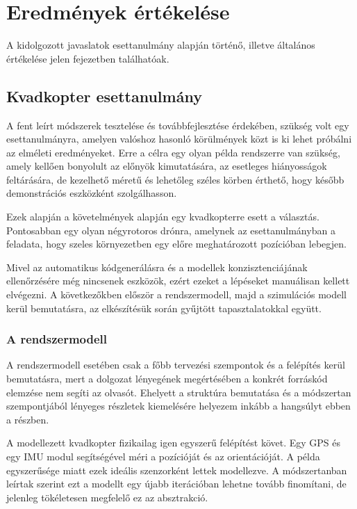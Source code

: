\chapter{Eredmények értékelése}
A kidolgozott javaslatok esettanulmány alapján történő, illetve általános értékelése jelen fejezetben találhatóak.

\section{Kvadkopter esettanulmány}
A fent leírt módszerek tesztelése és továbbfejlesztése érdekében, szükség volt egy esettanulmányra, amelyen valóshoz hasonló körülmények közt is ki lehet próbálni az elméleti eredményeket.
Erre a célra egy olyan példa rendszerre van szükség, amely kellően bonyolult az előnyök kimutatására, az esetleges hiányosságok feltárására, de kezelhető méretű és lehetőleg széles körben érthető, hogy később demonstrációs eszközként szolgálhasson.

Ezek alapján a követelmények alapján egy kvadkopterre esett a választás. Pontosabban egy olyan négyrotoros drónra, amelynek az esettanulmányban a feladata, hogy szeles környezetben egy előre meghatározott pozícióban lebegjen.

Mivel az automatikus kódgenerálásra és a modellek konzisztenciájának ellenőrzésére még nincsenek eszközök, ezért ezeket a lépéseket manuálisan kellett elvégezni.
A következőkben először a rendszermodell, majd a szimulációs modell kerül bemutatásra, az elkészítésük során gyűjtött tapasztalatokkal együtt.

    \subsection{A rendszermodell}
    A rendszermodell esetében csak a főbb tervezési szempontok és a felépítés kerül bemutatásra, mert a dolgozat lényegének megértésében a konkrét forráskód elemzése nem segíti az olvasót. Ehelyett a struktúra bemutatása és a módszertan szempontjából lényeges részletek kiemelésére helyezem inkább a hangsúlyt ebben a részben.
    
    A modellezett kvadkopter fizikailag igen egyszerű felépítést követ. Egy GPS és egy IMU modul segítségével méri a pozícióját és az orientációját. A példa egyszerűsége miatt ezek ideális szenzorként lettek modellezve.
    A módszertanban leírtak szerint ezt a modellt egy újabb iterációban lehetne tovább finomítani, de jelenleg tökéletesen megfelelő ez az absztrakció.
    
